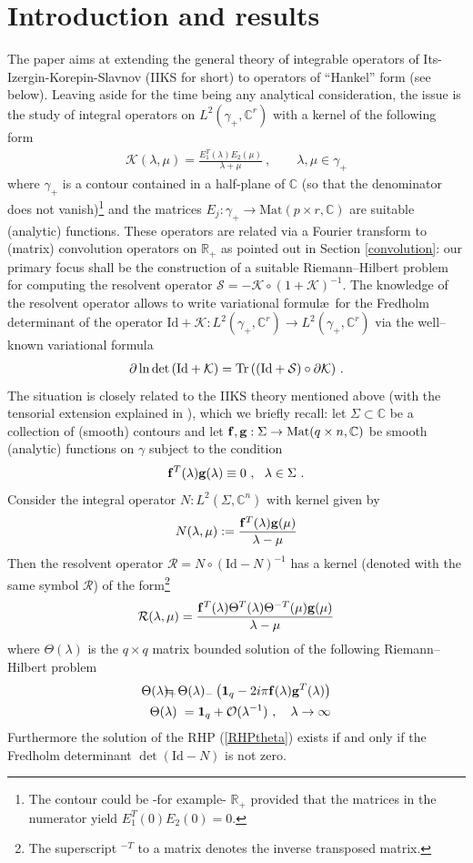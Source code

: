\documentclass{article}
\def \C{{\mathbf C}}
\def \K{{\mathcal K}}
\def\C{{\mathbb C}}
\def\&{&\hspace{-20pt}}
\def\R{{\mathbb R}}
\def\1{\mathbf 1}
\def \pa{\partial}
\def\Id{\mathrm{Id}}
\def\Tr{\mathop{{\rm Tr}}}
\def\Mat{\mathrm{Mat}}
\newcommand{\be}{\begin{eqnarray}}
\newcommand{\ee}{\end{eqnarray}}
\def\le{\left}
\def\ri{\right}
\begin{document}
\section{Introduction and results}
%
The paper aims at extending the general theory of integrable operators of Its-Izergin-Korepin-Slavnov (IIKS for short)  \cite{IIKS} to operators of ``Hankel'' form (see below).
Leaving aside for the time being any analytical consideration, the issue is the study of integral operators on $L^2(\gamma_+,\C^r)$  with a kernel of the following form 
\be
\K(\lambda,\mu) = \frac {E_1^T(\lambda)E_2(\mu)}{\lambda + \mu}\label{introK} \ , \qquad \lambda,\mu\in \gamma_+
\ee
where $\gamma_+$ is a contour contained in a half-plane of $\C$ (so that the denominator does not vanish)\footnote{ The contour could be -for example- $\R_+$ provided that the matrices in the numerator yield $E_1^T(0)E_2(0)=0$.} and the matrices $E_j:\gamma_+ \to \Mat(p\times r,\C)$ are suitable (analytic) functions.
%
These operators are related via a Fourier transform to (matrix) convolution operators on $\R_+$ as pointed out in Section \ref{convolution}: our primary focus shall be the construction of a suitable Riemann--Hilbert problem for computing the resolvent operator $\mathcal S = -\K\circ (1+\K)^{-1}$.  The knowledge of the resolvent operator allows to write variational formul\ae\ for the Fredholm determinant of the operator $\Id + \K:L^2(\gamma_+, \C^r) \to L^2(\gamma_+,\C^r)$ via the well--known variational formula
\be
\pa  \ln \det \le(\Id + \K\ri) = \Tr \le((\Id + \mathcal S\ri) \circ \pa \K)\ .
\label{varform}
\ee
The situation is closely related to the IIKS theory mentioned above (with the tensorial extension explained in \cite{ItsHarnad}), which we briefly recall: let $\Sigma\subset \C$ be a collection of (smooth) contours and let ${\bf f}, {\bf g}:\Sigma \to \Mat( q\times n,\C)$ be smooth (analytic) functions on $\gamma$ subject to the condition  
\be
{\bf f}^T(\lambda) {\bf g}(\lambda) \equiv 0\ ,\ \ \lambda \in \Sigma\ .\label{nonsingular}
\ee
Consider the integral operator $N: L^2(\Sigma, \C^n)$ with kernel given by 
\be
N(\lambda,\mu):= \frac { {\bf f}^T(\lambda) {\bf g}(\mu)}{\lambda - \mu} \label{introIIKS}
\ee
Then the resolvent operator $\mathcal R = N\circ(\Id-N)^{-1}$ has a kernel (denoted with the same symbol $\mathcal R$) of the form\footnote{The superscript $^{-T}$ to a matrix denotes the inverse transposed matrix.} 
\be
\mathcal R(\lambda, \mu)  = \frac { {\bf f}^T(\lambda) \Theta^T(\lambda) \Theta^{-T}(\mu) {\bf g}(\mu)} {\lambda - \mu} 
\ee
where $\Theta(\lambda)$ is the  $q\times q$ matrix bounded solution of the following Riemann--Hilbert problem 
\be
\Theta(\lambda)_+ &\&= \Theta(\lambda)_- \le(\1_q - 2i\pi {\bf f}(\lambda) {\bf g}^T(\lambda)\ri)\nonumber \\
\Theta(\lambda)  &\& = \1_q + \mathcal O(\lambda^{-1}) \ ,\ \ \ \lambda \to \infty \label{RHPtheta}
\ee
Furthermore the solution of the RHP (\ref{RHPtheta}) exists if and only if the Fredholm determinant  $\det (\Id - N)$ is not zero.
\end{document}
